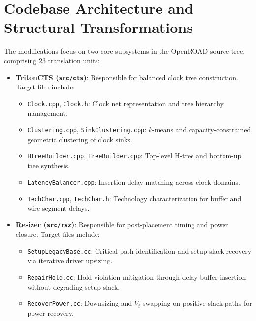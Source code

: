 \documentclass[10pt,twocolumn]{article}
\begin{document}
\section{Codebase Architecture and Structural Transformations}
The modifications focus on two core subsystems in the OpenROAD source tree, comprising 23 translation units:

\begin{itemize}
    \item \textbf{TritonCTS (\texttt{src/cts})}: Responsible for balanced clock tree construction. Target files include:
    \begin{itemize}
        \item \texttt{Clock.cpp}, \texttt{Clock.h}: Clock net representation and tree hierarchy management.
        \item \texttt{Clustering.cpp}, \texttt{SinkClustering.cpp}: $k$-means and capacity-constrained geometric clustering of clock sinks.
        \item \texttt{HTreeBuilder.cpp}, \texttt{TreeBuilder.cpp}: Top-level H-tree and bottom-up tree synthesis.
        \item \texttt{LatencyBalancer.cpp}: Insertion delay matching across clock domains.
        \item \texttt{TechChar.cpp}, \texttt{TechChar.h}: Technology characterization for buffer and wire segment delays.
    \end{itemize}
    \item \textbf{Resizer (\texttt{src/rsz})}: Responsible for post-placement timing and power closure. Target files include:
    \begin{itemize}
        \item \texttt{SetupLegacyBase.cc}: Critical path identification and setup slack recovery via iterative driver upsizing.
        \item \texttt{RepairHold.cc}: Hold violation mitigation through delay buffer insertion without degrading setup slack.
        \item \texttt{RecoverPower.cc}: Downsizing and $V_t$-swapping on positive-slack paths for power recovery.
    \end{itemize}
\end{itemize}
\end{document}
